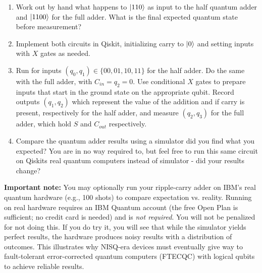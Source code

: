 \documentclass[11pt]{article}
\begin{document}
\begin{enumerate}[label=(\alph*)]

  \item Work out by hand what happens to $\ket{110}$ as input to the half quantum adder and $\ket{1100}$ for the full adder. What is the final expected quantum state before measurement?
  \item Implement both circuits in Qiskit, initializing carry to $\ket{0}$ and setting inputs with $X$ gates as needed.
  \item Run for inputs $(q_0,q_1)\in\{00,01,10,11\}$ for the half adder. Do the same with the full adder, with $C_{in}=q_2=0$. Use conditional $X$ gates to prepare inputs that start in the ground state on the appropriate qubit. Record outputs $(q_1,q_2)$ which represent the value of the addition and if carry is present, respectively for the half adder, and measure $(q_2,q_3)$ for the full adder, which hold $S$ and $C_{out}$ respectively.
  \item Compare the quantum adder results using a simulator did you find what you expected? You are in no way required to, but feel free to run this same circuit on Qiskits real quantum computers instead of simulator - did your results change?
\end{enumerate}

\textbf{Important note:} You may optionally run your ripple-carry adder on IBM’s real quantum hardware (e.g., 100 shots) to compare expectation vs. reality. Running on real hardware requires an IBM Quantum account (the free Open Plan is sufficient; no credit card is needed) and is \emph{not required}. You will not be penalized for not doing this.  
If you do try it, you will see that while the simulator yields perfect results, the hardware produces noisy results with a distribution of outcomes. This illustrates why NISQ-era devices must eventually give way to fault-tolerant error-corrected quantum computers (FTECQC) with logical qubits to achieve reliable results.
\end{document}
